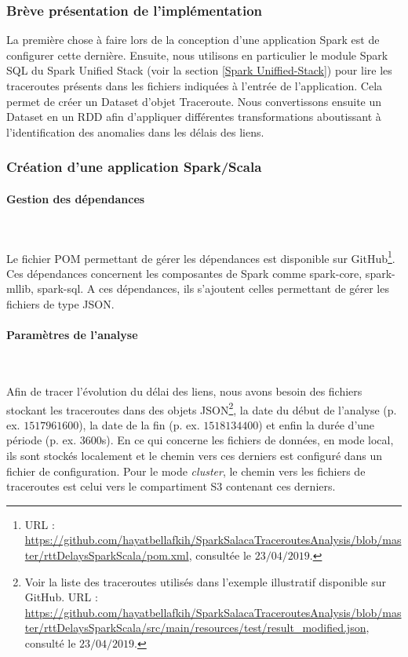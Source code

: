 \subsubsection{Brève présentation  de l'implémentation}

La première chose à faire lors de la conception d'une application Spark est de configurer cette dernière. Ensuite, nous utilisons en particulier le module  Spark SQL  du Spark Unified Stack (voir la section \ref{Spark Uniffied-Stack}) pour lire les traceroutes présents dans les fichiers indiquées à l'entrée de l'application. Cela permet de créer un Dataset d'objet Traceroute.  Nous convertissons ensuite un Dataset en un RDD afin d'appliquer différentes transformations aboutissant à l'identification des anomalies dans les délais des liens.

\subsubsection{Création d'une application Spark/Scala}

\paragraph{Gestion des dépendances}~

Le fichier POM permettant de gérer les dépendances est disponible sur GitHub\footnote{URL : \url{https://github.com/hayatbellafkih/SparkSalacaTraceroutesAnalysis/blob/master/rttDelaysSparkScala/pom.xml}, consultée le $23/04/2019$.}. Ces dépendances concernent les composantes de Spark comme spark-core, spark-mllib, spark-sql. A ces dépendances, ils s'ajoutent celles permettant de gérer les fichiers de type JSON. 

\paragraph{Paramètres de l'analyse}~

Afin de tracer l'évolution du délai des liens, nous avons besoin des fichiers stockant les  traceroutes  dans  des objets JSON\footnote{Voir la liste des traceroutes utilisés dans l'exemple illustratif disponible sur GitHub. URL : \url{https://github.com/hayatbellafkih/SparkSalacaTraceroutesAnalysis/blob/master/rttDelaysSparkScala/src/main/resources/test/result_modified.json}, consulté le $23/04/2019$.}, la date du début de l'analyse (p. ex. $ 1517961600 $), la date de la fin (p. ex. $ 1518134400 $) et enfin la durée d'une période (p. ex. $3600$s). En ce qui concerne les fichiers de données, en mode local, ils sont stockés localement et le chemin vers ces derniers est configuré dans un fichier de configuration. Pour le mode \textit{cluster}, le chemin vers les fichiers de traceroutes est celui vers le compartiment S3 contenant ces derniers.

